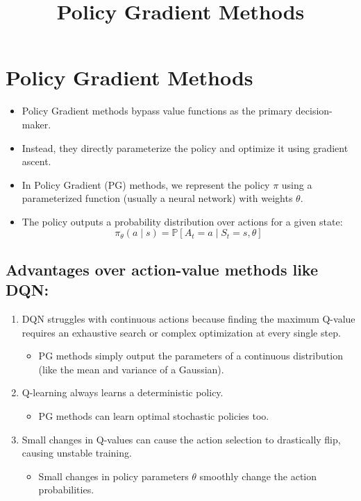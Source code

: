 \documentclass[12pt]{article}
\title{\textbf{Policy Gradient Methods}}
\author{}
\date{}
\begin{document}
\maketitle

\vspace{0.5cm}

\section*{Policy Gradient Methods}
\begin{itemize}[label=$\bullet$]
    \item Policy Gradient methods bypass value functions as the primary decision-maker.
    \item Instead, they directly parameterize the policy and optimize it using gradient ascent.
    \item In Policy Gradient (PG) methods, we represent the policy $\pi$ using a parameterized function (usually a neural network) with weights $\theta$.
    \item The policy outputs a probability distribution over actions for a given state:
    $$\pi_\theta(a \mid s) = \mathbb{P}[A_t = a \mid S_t = s, \theta]$$
\end{itemize}

\subsection*{Advantages over action-value methods like DQN:}
\begin{enumerate}
    \item DQN struggles with continuous actions because finding the maximum Q-value requires an exhaustive search or complex optimization at every single step.
    \begin{itemize}[label=$\circ$]
        \item PG methods simply output the parameters of a continuous distribution (like the mean and variance of a Gaussian).
    \end{itemize}
    \item Q-learning always learns a deterministic policy.
    \begin{itemize}[label=$\circ$]
        \item PG methods can learn optimal stochastic policies too.
    \end{itemize}
    \item Small changes in Q-values can cause the action selection to drastically flip, causing unstable training.
    \begin{itemize}[label=$\circ$]
        \item Small changes in policy parameters $\theta$ smoothly change the action probabilities.
    \end{itemize}
\end{enumerate}
\end{document}
